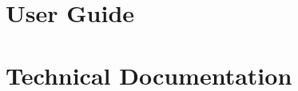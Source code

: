 \documentclass[a4paper]{report}
\begin{document}


\chapter{User Guide}

 



\printbibliography


\chapter{Technical Documentation}
\begin{refsection}

\printbibliography
\end{refsection}


\end{document}
